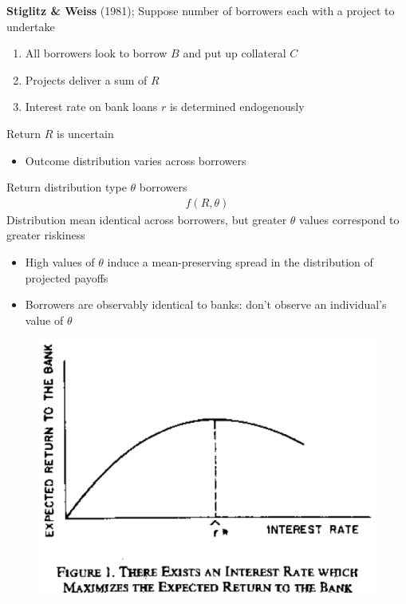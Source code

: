 \documentclass{beamer}
\begin{document}
\begin{frame}
 \textbf{Stiglitz \& Weiss} (1981); Suppose number of borrowers each with a project to undertake
\begin{enumerate}
  \item All borrowers look to borrow $B$ and put up collateral $C$
  \item Projects deliver a sum of $R$  
  \item Interest rate on bank loans $r$ is determined endogenously
\end{enumerate}
\end{frame}

\begin{frame} 
 Return $R$ is uncertain
 \begin{itemize}
   \item Outcome distribution varies across borrowers 
 \end{itemize}
 \medskip
 Return distribution type $\theta$ borrowers 
 \begin{align}
   f(R,\theta)
 \end{align}
 \medskip
 Distribution mean identical across borrowers, but greater $\theta$ values correspond to greater riskiness
 \begin{itemize}
   \item High values of $\theta$ induce a mean-preserving spread in the distribution of projected payoffs
   \item Borrowers are observably identical to banks: don't observe an individual's value of $\theta$
 \end{itemize}
\end{frame}

\begin{frame}
  \begin{figure}
    \includegraphics{stiglitz_weiss1.eps}
  \end{figure}
\end{frame}
\end{document}
